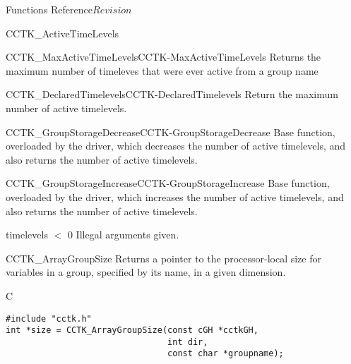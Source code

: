 \begin{cactuspart}{ Functions Reference}{}{$Revision$}
\begin{FunctionDescription}{CCTK\_ActiveTimeLevels}
\begin{SeeAlsoSection}
\begin{SeeAlso2}{CCTK\_MaxActiveTimeLevels}{CCTK-MaxActiveTimeLevels}
  Returns the maximum number of timeleves that were ever active from a group name
\end{SeeAlso2}
\begin{SeeAlso2}{CCTK\_DeclaredTimelevels}{CCTK-DeclaredTimelevels}
Return the maximum number of active timelevels.
\end{SeeAlso2}
\begin{SeeAlso2}{CCTK\_GroupStorageDecrease}{CCTK-GroupStorageDecrease}
Base function, overloaded by the driver, which decreases the number of
active timelevels, and also returns the number of active timelevels.
\end{SeeAlso2}
\begin{SeeAlso2}{CCTK\_GroupStorageIncrease}{CCTK-GroupStorageIncrease}
Base function, overloaded by the driver, which increases the number of
active timelevels, and also returns the number of active timelevels.
\end{SeeAlso2}
\end{SeeAlsoSection}

\begin{ErrorSection}
\begin{Error}{timelevels $<$ 0}
Illegal arguments given.
\end{Error}
\end{ErrorSection}

\end{FunctionDescription}



\begin{FunctionDescription}{CCTK\_ArrayGroupSize}{}
\label{CCTK-ArrayGroupSize}
Returns a pointer to the processor-local size for variables in a
group, specified by its name, in a given dimension.
\begin{SynopsisSection}
\begin{Synopsis}{C}
\begin{verbatim}
#include "cctk.h"
int *size = CCTK_ArrayGroupSize(const cGH *cctkGH,
                                int dir,
                                const char *groupname);
\end{verbatim}
\end{Synopsis}
\end{SynopsisSection}


\end{FunctionDescription}
\end{cactuspart}
